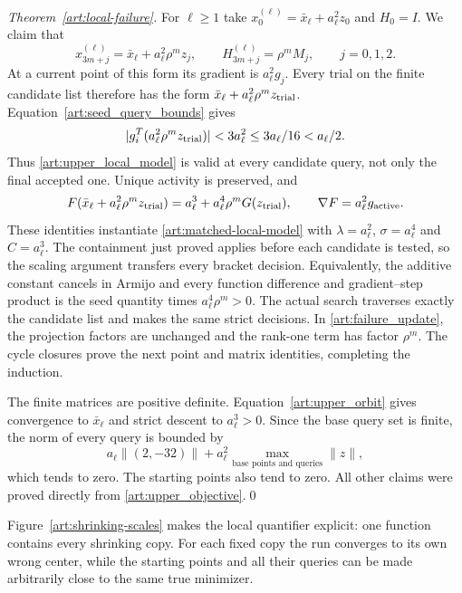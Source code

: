 \begin{proof}[Theorem~\ref{art:local-failure}]
For $\ell\ge1$ take $x_0^{(\ell)}=\bar x_\ell+a_\ell^2z_0$ and $H_0=I$. We claim that
\begin{equation}\label{art:upper_orbit}
 x_{3m+j}^{(\ell)}=\bar x_\ell+a_\ell^2\rho^mz_j,\qquad
 H_{3m+j}^{(\ell)}=\rho^mM_j,\qquad j=0,1,2.
\end{equation}
At a current point of this form its gradient is $a_\ell^2g_j$. Every trial
on the finite candidate list therefore has the form
$\bar x_\ell+a_\ell^2\rho^mz_{\rm trial}$. Equation~\eqref{art:seed_query_bounds}
gives
\[
 |g_i^T(a_\ell^2\rho^mz_{\rm trial})|<3a_\ell^2
 \le3a_\ell/16<a_\ell/2.
\]
Thus \eqref{art:upper_local_model} is valid at every candidate query,
not only the final accepted one. Unique activity is preserved, and
\[
 F(\bar x_\ell+a_\ell^2\rho^mz_{\rm trial})
   =a_\ell^3+a_\ell^4\rho^mG(z_{\rm trial}),\qquad
 \nabla F=a_\ell^2g_{\rm active}.
\]
These identities instantiate \eqref{art:matched-local-model} with
$\lambda=a_\ell^2$, $\sigma=a_\ell^4$ and $C=a_\ell^3$. The containment just
proved applies before each candidate is tested, so the scaling argument
transfers every bracket decision. Equivalently, the additive constant
cancels in Armijo and every function difference and gradient--step product
is the seed quantity times $a_\ell^4\rho^m>0$. The actual search traverses
exactly the candidate list and makes the same strict decisions.
In \eqref{art:failure_update}, the projection factors are unchanged and
the rank-one term has factor $\rho^m$. The cycle closures prove the next
point and matrix identities, completing the induction.

The finite matrices are positive definite. Equation~\eqref{art:upper_orbit}
gives convergence to $\bar x_\ell$ and strict descent to $a_\ell^3>0$.
Since the base query set is finite, the norm of every query is bounded by
\[
 a_\ell\|(2,-32)\|+a_\ell^2\max_{\text{base points and queries}}\|z\|,
\]
which tends to zero. The starting points also tend to zero. All other
claims were proved directly from \eqref{art:upper_objective}.\qed
\end{proof}


Figure~\ref{art:shrinking-scales} makes the local quantifier explicit:
one function contains every shrinking copy. For each fixed copy the run
converges to its own wrong center, while the starting points and all their
queries can be made arbitrarily close to the same true minimizer.

